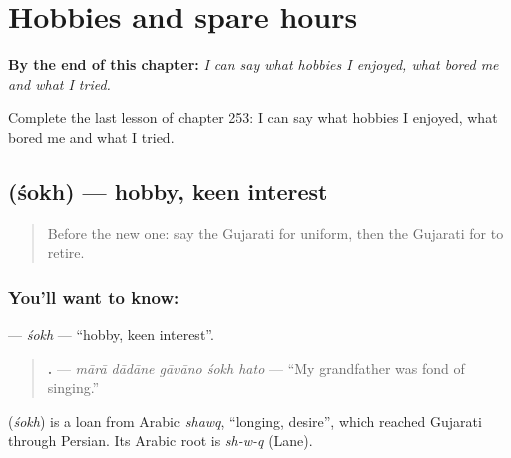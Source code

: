 
\chapter{Hobbies and spare hours}
\label{ch:gu-hobbies-and-spare-hours}

\begin{chapteropening}
\textbf{By the end of this chapter:} \emph{I can say what hobbies I enjoyed, what bored me and what I tried.}

Complete the last lesson of chapter 253: I can say what hobbies I enjoyed, what bored me and what I tried.
\end{chapteropening}

\section[\texorpdfstring{\gu{શોખ} (śokh)}{શોખ (śokh)}]{ (śokh) — hobby, keen interest}

\label{lesson:GU-C253-shokh}



\begin{quote}
Before the new one: say the Gujarati for uniform, then the Gujarati for to retire.
\end{quote}

\subsection*{You'll want to know: }
\textbf{} — \emph{śokh} — \textquotedblleft{}hobby, keen interest\textquotedblright{}.

\begin{quote}
\textbf{    .} — \emph{mārā dādāne gāvāno śokh hato} — \textquotedblleft{}My grandfather was fond of singing.\textquotedblright{}
\end{quote}

\begin{cousinweb}
\textbf{} (\emph{śokh}) is a loan from Arabic \emph{shawq}, \textquotedblleft{}longing, desire\textquotedblright{}, which reached Gujarati through Persian. Its Arabic root is \emph{sh-w-q} (Lane).
\end{cousinweb}

